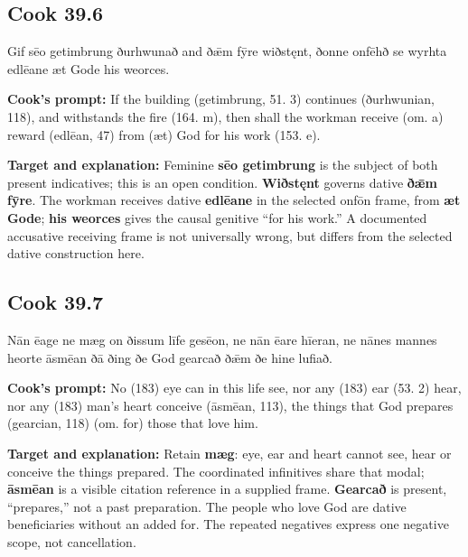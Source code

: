 \par\begin{minipage}{\linewidth}\raggedright
\subsection*{Cook 39.6}

Gif sēo getimbrung ðurhwunað and ðǣm fȳre wiðstęnt, ðonne onfēhð se wyrhta edlēane æt Gode his weorces.

\textbf{Cook's prompt:} If the building (getimbrung, 51. 3) continues (ðurhwunian, 118), and withstands the fire (164. m), then shall the workman receive (om. a) reward (edlēan, 47) from (æt) God for his work (153. e).

\textbf{Target and explanation:} Feminine \textbf{sēo getimbrung} is the subject of both present indicatives; this is an open condition. \textbf{Wiðstęnt} governs dative \textbf{ðǣm fȳre}. The workman receives dative \textbf{edlēane} in the selected onfōn frame, from \textbf{æt Gode}; \textbf{his weorces} gives the causal genitive “for his work.” A documented accusative receiving frame is not universally wrong, but differs from the selected dative construction here.

\end{minipage}\par\addvspace{4pt}

\par\begin{minipage}{\linewidth}\raggedright
\subsection*{Cook 39.7}

Nān ēage ne mæg on ðissum līfe gesēon, ne nān ēare hīeran, ne nānes mannes heorte āsmēan ðā ðing ðe God gearcað ðǣm ðe hine lufiað.

\textbf{Cook's prompt:} No (183) eye can in this life see, nor any (183) ear (53. 2) hear, nor any (183) man’s heart conceive (āsmēan, 113), the things that God prepares (gearcian, 118) (om. for) those that love him.

\textbf{Target and explanation:} Retain \textbf{mæg}: eye, ear and heart cannot see, hear or conceive the things prepared. The coordinated infinitives share that modal; \textbf{āsmēan} is a visible citation reference in a supplied frame. \textbf{Gearcað} is present, “prepares,” not a past preparation. The people who love God are dative beneficiaries without an added for. The repeated negatives express one negative scope, not cancellation.

\end{minipage}\par\addvspace{4pt}

